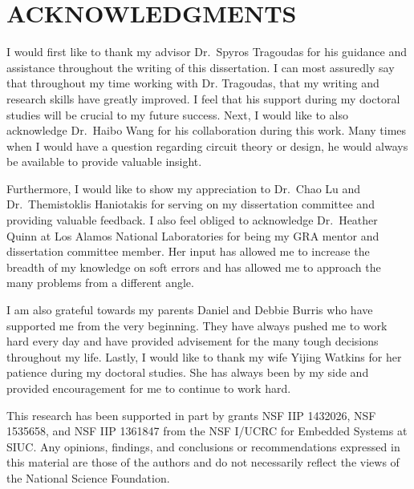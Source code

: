


\chapter*{ACKNOWLEDGMENTS}

I would first like to thank my advisor Dr.\ Spyros Tragoudas for his guidance and assistance throughout the writing of this dissertation. I can most assuredly say that throughout my time working with Dr. Tragoudas, that my writing and research skills have greatly improved. I feel that his support during my doctoral studies will be crucial to my future success. Next, I would like to also acknowledge Dr.\ Haibo Wang for his collaboration during this work. Many times when I would have a question regarding circuit theory or design, he would always be available to provide valuable insight.

Furthermore, I would like to show my appreciation to Dr.\ Chao Lu and Dr.\ Themistoklis Haniotakis for serving on my dissertation committee and providing valuable feedback. I also feel obliged to acknowledge Dr.\ Heather Quinn at Los Alamos National Laboratories for being my GRA mentor and dissertation committee member. Her input has allowed me to increase the breadth of my knowledge on soft errors and has allowed me to approach the many problems from a different angle. 

I am also grateful towards my parents Daniel and Debbie Burris who have supported me from the very beginning. They have always pushed me to work hard every day and have provided advisement for the many tough decisions throughout my life. Lastly, I would like to thank my wife Yijing Watkins for her patience during my doctoral studies. She has always been by my side and provided encouragement for me to continue to work hard. 

This research has been supported in part by grants NSF IIP 1432026, NSF 1535658, and NSF IIP 1361847 from the NSF I/UCRC for Embedded Systems at SIUC. Any opinions, findings, and conclusions or recommendations expressed in this material are those of the authors and do not necessarily reflect the views of the National Science Foundation.
 
\newpage

